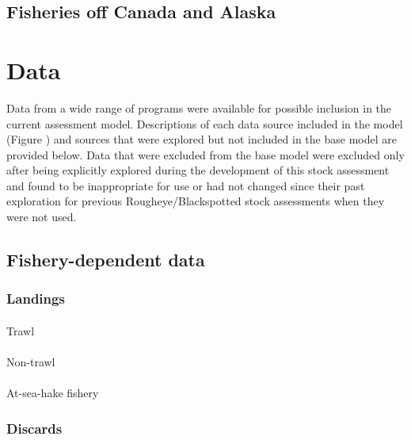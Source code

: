 \documentclass[
]{scrartcl}
\makeatletter
\let\oldparagraph\paragraph
\renewcommand{\paragraph}{
    \@ifstar
      \xxxParagraphStar
      \xxxParagraphNoStar
  }
\newcommand{\xxxParagraphStar}[1]{\oldparagraph*{#1}\mbox{}}
\newcommand{\xxxParagraphNoStar}[1]{\oldparagraph{#1}\mbox{}}
\makeatother
\begin{document}
\subsection{Fisheries off Canada and
Alaska}\label{fisheries-off-canada-and-alaska}

\newpage{}

\section{Data}\label{data}

Data from a wide range of programs were available for possible inclusion
in the current assessment model. Descriptions of each data source
included in the model (Figure ) and sources that were explored but not
included in the base model are provided below. Data that were excluded
from the base model were excluded only after being explicitly explored
during the development of this stock assessment and found to be
inappropriate for use or had not changed since their past exploration
for previous Rougheye/Blackspotted stock assessments when they were not
used.

\subsection{Fishery-dependent data}\label{fishery-dependent-data}

\subsubsection{Landings}\label{landings}

\paragraph{Trawl}\label{trawl}

\paragraph{Non-trawl}\label{non-trawl}

\paragraph{At-sea-hake fishery}\label{at-sea-hake-fishery}

\subsubsection{Discards}\label{discards}
\end{document}
